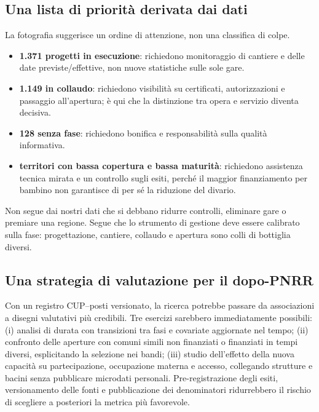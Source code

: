 \documentclass[10pt,a4paper]{article}
\begin{document}
\subsection{Una lista di priorità derivata dai dati}

La fotografia suggerisce un ordine di attenzione, non una classifica di colpe.

\begin{itemize}
  \item \textbf{1.371 progetti in esecuzione}: richiedono monitoraggio di cantiere e delle date previste/effettive, non nuove statistiche sulle sole gare.
  \item \textbf{1.149 in collaudo}: richiedono visibilità su certificati, autorizzazioni e passaggio all'apertura; è qui che la distinzione tra opera e servizio diventa decisiva.
  \item \textbf{128 senza fase}: richiedono bonifica e responsabilità sulla qualità informativa.
  \item \textbf{territori con bassa copertura e bassa maturità}: richiedono assistenza tecnica mirata e un controllo sugli esiti, perché il maggior finanziamento per bambino non garantisce di per sé la riduzione del divario.
\end{itemize}

Non segue dai nostri dati che si debbano ridurre controlli, eliminare gare o premiare una regione. Segue che lo strumento di gestione deve essere calibrato sulla fase: progettazione, cantiere, collaudo e apertura sono colli di bottiglia diversi.

\subsection{Una strategia di valutazione per il dopo-PNRR}

Con un registro CUP--posti versionato, la ricerca potrebbe passare da associazioni a disegni valutativi più credibili. Tre esercizi sarebbero immediatamente possibili: (i) analisi di durata con transizioni tra fasi e covariate aggiornate nel tempo; (ii) confronto delle aperture con comuni simili non finanziati o finanziati in tempi diversi, esplicitando la selezione nei bandi; (iii) studio dell'effetto della nuova capacità su partecipazione, occupazione materna e accesso, collegando strutture e bacini senza pubblicare microdati personali. Pre-registrazione degli esiti, versionamento delle fonti e pubblicazione dei denominatori ridurrebbero il rischio di scegliere a posteriori la metrica più favorevole.
\end{document}
